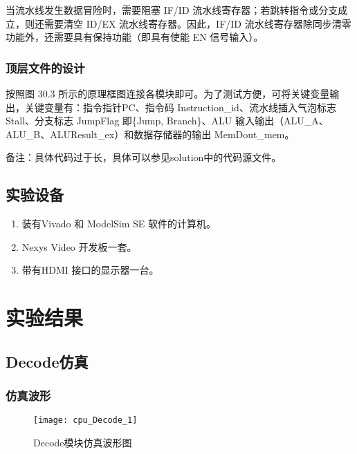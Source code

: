 \documentclass{../source/Experiment}
\begin{document}
当流水线发生数据冒险时，需要阻塞 IF/ID 流水线寄存器；若跳转指令或分支成立，则还需要清空
ID/EX 流水线寄存器。因此，IF/ID 流水线寄存器除同步清零功能外，还需要具有保持功能（即具有使能
EN 信号输入）。
\subsubsection{顶层文件的设计}

按照图 30.3 所示的原理框图连接各模块即可。为了测试方便，可将关键变量输出，关键变量有：指令指针PC、指令码 Instruction\_id、流水线插入气泡标志 Stall、分支标志 JumpFlag 即\{Jump, Branch\}、ALU 输入输出（ALU\_A、ALU\_B、ALUResult\_ex）和数据存储器的输出 MemDout\_mem。

备注：具体代码过于长，具体可以参见solution中的代码源文件。

\subsection{实验设备}
\begin{enumerate}
    \item  装有Vivado 和 ModelSim SE 软件的计算机。
    \item  Nexys Video 开发板一套。
    \item  带有HDMI 接口的显示器一台。
\end{enumerate}

\section{实验结果}
\subsection{Decode仿真}
\subsubsection{仿真波形}
\begin{figure}[H]
    \centering
    \texttt{[image: cpu\_Decode\_1]}
    \caption{Decode模块仿真波形图}
\end{figure}
\end{document}
